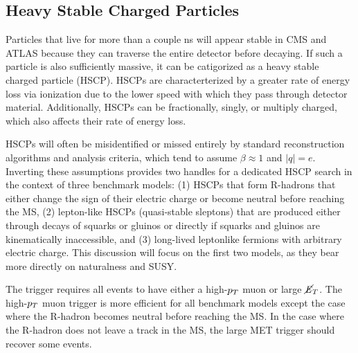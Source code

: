 \documentclass[12pt]{article}
\begin{document}
\subsection{Heavy Stable Charged Particles}
    Particles that live for more than a couple ns  will appear stable in CMS and ATLAS because they can traverse the entire detector before decaying. If such a particle is also sufficiently massive, it can be catigorized as a heavy stable charged particle (HSCP). HSCPs are characterterized by a greater rate of energy loss via ionization due to the lower speed with which they pass through detector material. Additionally, HSCPs can be fractionally, singly, or multiply charged, which also affects their rate of energy loss. 

    HSCPs will often be misidentified or missed entirely by standard reconstruction algorithms and analysis criteria, which tend to assume $\beta \approx \num{1}$ and $\lvert q \rvert = e$. Inverting these assumptions provides two handles for a dedicated HSCP search in the context of three benchmark models: (1) HSCPs that form R-hadrons that either change the sign of their electric charge or become neutral before reaching the MS, (2) lepton-like HSCPs (quasi-stable sleptons) that are produced either through decays of squarks or gluinos or directly if squarks and gluinos are kinematically inaccessible, and (3) long-lived leptonlike fermions with arbitrary electric charge. This discussion will focus on the first two models, as they bear more directly on naturalness and SUSY.

     

    The trigger requires all events to have either a high-$p_T$ muon or large $\cancel{\it{E}}_{T}$. The high-$p_T$ muon trigger is more efficient for all benchmark models except the case where the R-hadron becomes neutral before reaching the MS. In the case where the R-hadron does not leave a track in the MS, the large MET trigger should recover some events.  
\end{document}
